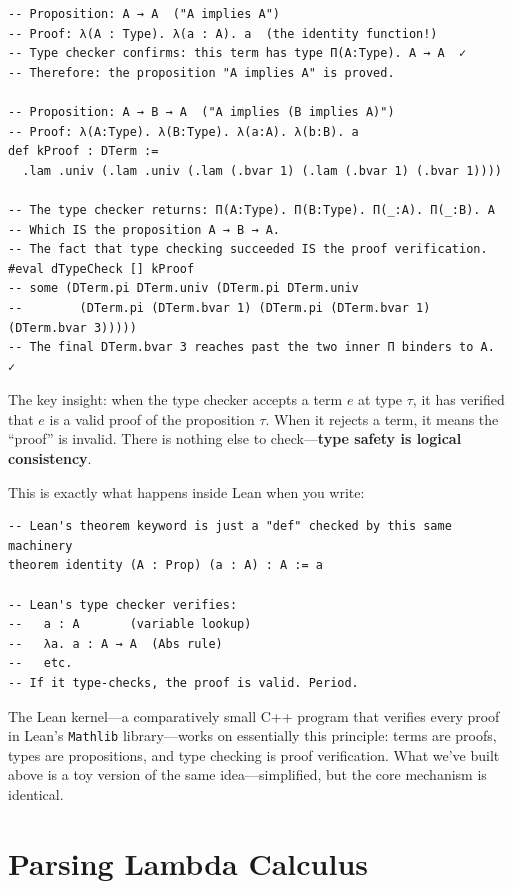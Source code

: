 \documentclass[11pt,a4paper]{article}
\theoremstyle{definition}
\begin{document}
\begin{verbatim}
-- Proposition: A → A  ("A implies A")
-- Proof: λ(A : Type). λ(a : A). a  (the identity function!)
-- Type checker confirms: this term has type Π(A:Type). A → A  ✓
-- Therefore: the proposition "A implies A" is proved.

-- Proposition: A → B → A  ("A implies (B implies A)")
-- Proof: λ(A:Type). λ(B:Type). λ(a:A). λ(b:B). a
def kProof : DTerm :=
  .lam .univ (.lam .univ (.lam (.bvar 1) (.lam (.bvar 1) (.bvar 1))))

-- The type checker returns: Π(A:Type). Π(B:Type). Π(_:A). Π(_:B). A
-- Which IS the proposition A → B → A.
-- The fact that type checking succeeded IS the proof verification.
#eval dTypeCheck [] kProof
-- some (DTerm.pi DTerm.univ (DTerm.pi DTerm.univ
--        (DTerm.pi (DTerm.bvar 1) (DTerm.pi (DTerm.bvar 1) (DTerm.bvar 3)))))
-- The final DTerm.bvar 3 reaches past the two inner Π binders to A.  ✓
\end{verbatim}

The key insight: when the type checker accepts a term $e$ at type $\tau$, it
has verified that $e$ is a valid proof of the proposition $\tau$. When it
rejects a term, it means the ``proof'' is invalid. There is nothing else to
check---\textbf{type safety is logical consistency}.

This is exactly what happens inside Lean when you write:

\begin{verbatim}
-- Lean's theorem keyword is just a "def" checked by this same machinery
theorem identity (A : Prop) (a : A) : A := a

-- Lean's type checker verifies:
--   a : A       (variable lookup)
--   λa. a : A → A  (Abs rule)
--   etc.
-- If it type-checks, the proof is valid. Period.
\end{verbatim}

The Lean kernel---a comparatively small C++ program that verifies every proof in
Lean's \texttt{Mathlib} library---works on essentially this principle: terms are proofs,
types are propositions, and type checking is proof verification. What we've
built above is a toy version of the same idea---simplified, but the core
mechanism is identical.

\section{Parsing Lambda Calculus}\label{sec:parser}
\end{document}
